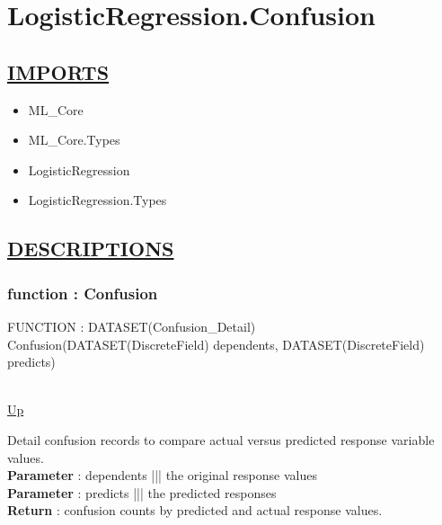 \chapter*{LogisticRegression.Confusion}
\hypertarget{LogisticRegression.Confusion}{}

\section*{\underline{IMPORTS}}
\begin{itemize}
\item ML\_Core
\item ML\_Core.Types
\item LogisticRegression
\item LogisticRegression.Types
\end{itemize}

\section*{\underline{DESCRIPTIONS}}
\subsection*{function : Confusion}
\hypertarget{ecldoc:logisticregression.confusion}{FUNCTION : DATASET(Confusion\_Detail) Confusion(DATASET(DiscreteField) dependents, DATASET(DiscreteField) predicts)} \\
\hyperlink{ecldoc:}{Up} \\
\par
Detail confusion records to compare actual versus predicted response variable values. \\
\textbf{Parameter} : dependents ||| the original response values \\
\textbf{Parameter} : predicts ||| the predicted responses \\
\textbf{Return} : confusion counts by predicted and actual response values. \\
